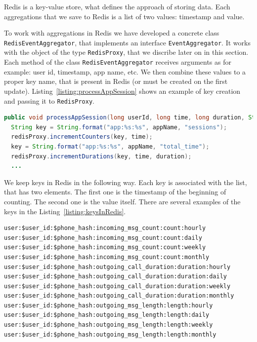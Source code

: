 Redis is a key-value store, what defines the approach of storing data.
Each aggregations that we save to Redis is a list of two values: timestamp and value.

To work with aggregations in Redis we have developed a concrete class \lstinline{RedisEventAggregator}, that implements an interface \lstinline{EventAggregator}.
It works with the object of the type \lstinline{RedisProxy}, that we discribe later on in this section.
Each method of the class \lstinline{RedisEventAggregator} receives arguments as for example: user id, timestamp, app name, etc.
We then combine these values to a proper key name, that is present in Redis (or must be created on the first update).
Listing~\ref{listing:processAppSession} shows an example of key creation and passing it to \lstinline{RedisProxy}.

\begin{lstlisting}[float=h, caption=Example of key creation for aggregation update., label=listing:processAppSession, language=Java]
public void processAppSession(long userId, long time, long duration, String appName) {
  String key = String.format("app:%s:%s", appName, "sessions");
  redisProxy.incrementCounters(key, time);
  key = String.format("app:%s:%s", appName, "total_time");
  redisProxy.incrementDurations(key, time, duration);
  ...
\end{lstlisting}

We keep keys in Redis in the following way.
Each key is associated with the list, that has two elements.
The first one is the timestamp of the beginning of counting.
The second one is the value itself.
There are several examples of the keys in the Listing~\ref{listing:keysInRedis}.

\begin{lstlisting}[float=h, caption=Examples of the keys in Redis., label=listing:keysInRedis]
user:$user_id:$phone_hash:incoming_msg_count:count:hourly
user:$user_id:$phone_hash:incoming_msg_count:count:daily
user:$user_id:$phone_hash:incoming_msg_count:count:weekly
user:$user_id:$phone_hash:incoming_msg_count:count:monthly
user:$user_id:$phone_hash:outgoing_call_duration:duration:hourly
user:$user_id:$phone_hash:outgoing_call_duration:duration:daily
user:$user_id:$phone_hash:outgoing_call_duration:duration:weekly
user:$user_id:$phone_hash:outgoing_call_duration:duration:monthly
user:$user_id:$phone_hash:outgoing_msg_length:length:hourly
user:$user_id:$phone_hash:outgoing_msg_length:length:daily
user:$user_id:$phone_hash:outgoing_msg_length:length:weekly
user:$user_id:$phone_hash:outgoing_msg_length:length:monthly
\end{lstlisting}

